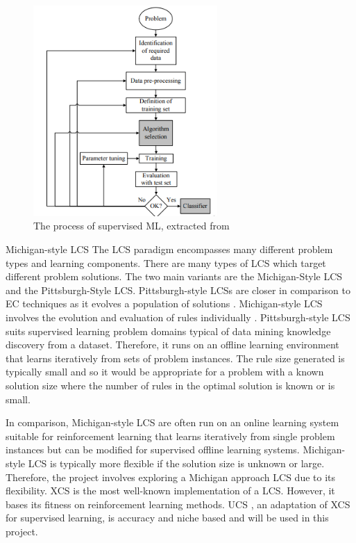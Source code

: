 \begin{figure} [H]
	\begin{center}
		\includegraphics[width=70mm, scale=0.5]{supervisedLearning.png}
		\caption{ The process of supervised ML, extracted from \cite{kotsiantis2007supervised}}
		\label{fig:supervisedLearning}
	\end{center}
	
\end{figure}

Michigan-style LCS \label{subsec:mich}
The LCS paradigm encompasses many different problem types and learning components. There are many types of LCS which target different problem solutions. The two main variants are the Michigan-Style LCS and the Pittsburgh-Style LCS. Pittsburgh-style LCSs are closer in comparison to EC techniques as it evolves a population of solutions \cite{butz2010learning}. Michigan-style LCS involves the evolution and evaluation of rules individually \cite{butz2010learning}. Pittsburgh-style LCS suits supervised learning problem domains typical of data mining knowledge discovery from a dataset. Therefore, it runs on an offline learning environment that learns iteratively from sets of problem instances. The rule size generated is typically small and so it would be appropriate for a problem with a known solution size where the number of rules in the optimal solution is known or is small. 

In comparison, Michigan-style LCS are often run on an online learning system suitable for reinforcement learning that learns iteratively from single problem instances but can be modified for supervised offline learning systems. Michigan-style LCS is typically more flexible if the solution size is unknown or large. Therefore, the project involves exploring a Michigan approach LCS due to its flexibility. XCS is the most well-known implementation of a LCS. However, it bases its fitness on reinforcement learning methods. UCS \cite{urbanowicz2017introduction}, an adaptation of XCS for supervised learning, is accuracy and niche based and will be used in this project. 

